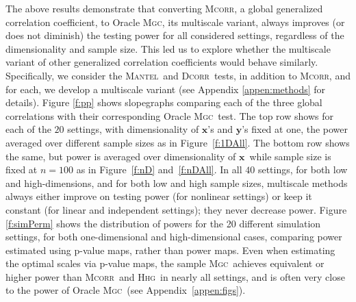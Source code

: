 \documentclass[11pt]{article}
\providecommand{\sct}[1]{{\normalfont\textsc{#1}}}
\providecommand{\mb}[1]{\boldsymbol{#1}}
\newcommand{\Mgc}{\sct{Mgc}}
\newcommand{\Hhg}{\sct{Hhg}}
\newcommand{\Dcorr}{\sct{Dcorr}}
\newcommand{\Mcorr}{\sct{Mcorr}}
\newcommand{\Mantel}{\sct{Mantel}}
\newcommand{\mbx}{\ensuremath{\mb{x}}}
\newcommand{\mby}{\ensuremath{\mb{y}}}
\begin{document}
The above results demonstrate that converting \Mcorr, a global generalized correlation coefficient, to Oracle \Mgc, its multiscale variant, always improves (or does not diminish) the testing power for all considered settings, regardless of the dimensionality and sample size.  This led us to explore whether the multiscale variant of other generalized correlation coefficients would behave similarly.  Specifically, we consider the \Mantel~and \Dcorr~tests, in addition to \Mcorr, and for each, we develop a multiscale variant (see Appendix \ref{appen:methods} for details). 
Figure \ref{f:pp} shows slopegraphs comparing each of the three global correlations with their corresponding Oracle \Mgc~test.  The top row shows for each of the $20$ settings, with dimensionality of \mbx's and \mby's  fixed at one, the  power averaged over different sample sizes as in Figure~\ref{f:1DAll}.  The bottom row shows the same, but power is averaged over dimensionality of \mbx~while sample size is fixed at $n=100$ as in Figure~\ref{f:nD} and~\ref{f:nDAll}.  In all $40$ settings, for both low and high-dimensions, and for both low and high sample sizes, multiscale methods always either improve on testing power (for nonlinear settings) or keep it constant (for linear and independent settings); they never decrease power. 
%
%
%
%
%
%
Figure \ref{f:simPerm} shows the distribution of powers for the 20 different simulation settings, for both one-dimensional and high-dimensional cases, comparing power estimated using p-value maps, rather than power maps.  
Even when estimating the optimal scales via p-value maps, the sample \Mgc~achieves equivalent or higher power than \Mcorr~and \Hhg~in nearly all settings, and is often very close to the power of Oracle \Mgc~(see Appendix~\ref{appen:figs}).
\end{document}
